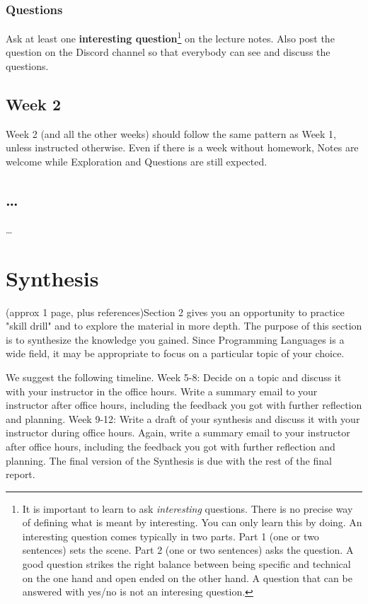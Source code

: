 \documentclass{article}
\theoremstyle{theorem}
\theoremstyle{definition}
\theoremstyle{remark}
\begin{document}
\subsubsection{Questions}

Ask at least one \textbf{interesting question}\footnote{It is important to learn to ask \emph{interesting} questions. There is no precise way of defining what is meant by interesting. You can only learn this by doing. An interesting question comes typically in two parts. Part 1 (one or two sentences) sets the scene. Part 2 (one or two sentences) asks the question. A good question strikes the right balance between being specific and technical on the one hand and open ended on the other hand. A question that can be answered with yes/no is not an interesing question.} on the lecture notes. Also post the question on the Discord channel so that everybody can see and discuss the questions.

\subsection{Week 2}

Week 2 (and all the other weeks) should follow the same pattern as Week 1, unless instructed otherwise. Even if there is a week without homework, Notes are welcome while Exploration and Questions are still expected.

\subsection{\ldots}

\ldots

\section{Synthesis}

(approx 1 page, plus references)Section 2 gives you an opportunity to practice "skill drill" and to explore the material in more depth. The purpose of this section is to synthesize the knowledge you gained. Since Programming Languages is a wide field, it may be appropriate to focus on a particular topic of your choice. 

We suggest the following timeline. Week 5-8: Decide on a topic and discuss it with your instructor in the office hours. Write a summary email to your instructor after office hours, including the feedback you got with further reflection and planning. Week 9-12: Write a draft of your synthesis and discuss it with your instructor during office hours. Again, write a summary email to your instructor after office hours, including the feedback you got with further reflection and planning. The final version of the Synthesis is due with the rest of the final report.
\end{document}

